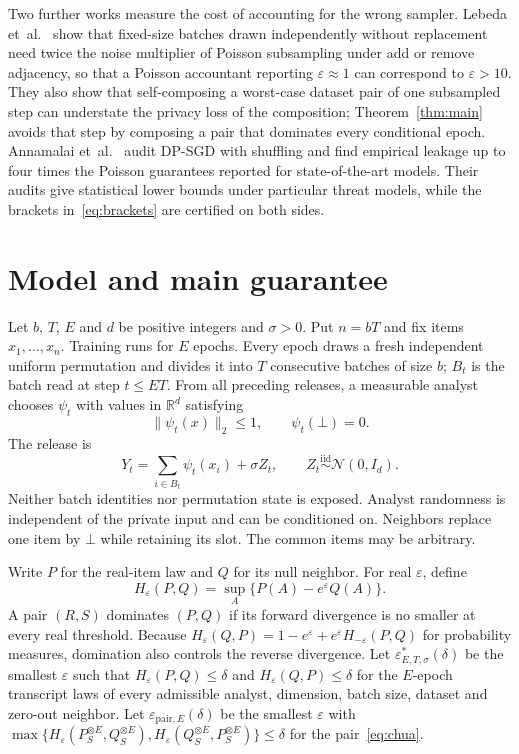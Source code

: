 \documentclass[conference]{IEEEtran}
\newcommand{\R}{\mathbb R}
\newcommand{\N}{\mathcal N}
\newcommand{\eps}{\varepsilon}
\newcommand{\pair}{\mathrm{pair}}
\begin{document}
Two further works measure the cost of accounting for the wrong sampler. Lebeda et~al.~\cite{lebeda} show that fixed-size batches drawn independently without replacement need twice the noise multiplier of Poisson subsampling under add or remove adjacency, so that a Poisson accountant reporting $\eps\approx1$ can correspond to $\eps>10$. They also show that self-composing a worst-case dataset pair of one subsampled step can understate the privacy loss of the composition; Theorem~\ref{thm:main} avoids that step by composing a pair that dominates every conditional epoch. Annamalai et~al.~\cite{annamalai} audit DP-SGD with shuffling and find empirical leakage up to four times the Poisson guarantees reported for state-of-the-art models. Their audits give statistical lower bounds under particular threat models, while the brackets in~\eqref{eq:brackets} are certified on both sides.

\section{Model and main guarantee}\label{sec:model}
Let $b$, $T$, $E$ and $d$ be positive integers and $\sigma>0$. Put $n=bT$ and fix items $x_1,\ldots,x_n$. Training runs for $E$ epochs. Every epoch draws a fresh independent uniform permutation and divides it into $T$ consecutive batches of size $b$; $B_t$ is the batch read at step $t\le ET$. From all preceding releases, a measurable analyst chooses $\psi_t$ with values in $\R^d$ satisfying
\[
 \|\psi_t(x)\|_2\le1,\qquad \psi_t(\bot)=0.
\]
The release is
\begin{equation}\label{eq:release}
 Y_t=\sum_{i\in B_t}\psi_t(x_i)+\sigma Z_t,
 \qquad Z_t\stackrel{\mathrm{iid}}\sim\N(0,I_d).
\end{equation}
Neither batch identities nor permutation state is exposed. Analyst randomness is independent of the private input and can be conditioned on. Neighbors replace one item by $\bot$ while retaining its slot. The common items may be arbitrary.

Write $P$ for the real-item law and $Q$ for its null neighbor. For real $\eps$, define
\[
 H_\eps(P,Q)=\sup_A\{P(A)-e^\eps Q(A)\}.
\]
A pair $(R,S)$ dominates $(P,Q)$ if its forward divergence is no smaller at every real threshold. Because $H_\eps(Q,P)=1-e^\eps+e^\eps H_{-\eps}(P,Q)$ for probability measures, domination also controls the reverse divergence. Let $\eps^*_{E,T,\sigma}(\delta)$ be the smallest $\eps$ such that $H_\eps(P,Q)\le\delta$ and $H_\eps(Q,P)\le\delta$ for the $E$-epoch transcript laws of every admissible analyst, dimension, batch size, dataset and zero-out neighbor. Let $\eps_{\pair,E}(\delta)$ be the smallest $\eps$ with $\max\{H_\eps(P_S^{\otimes E},Q_S^{\otimes E}),H_\eps(Q_S^{\otimes E},P_S^{\otimes E})\}\le\delta$ for the pair~\eqref{eq:chua}.
\end{document}
